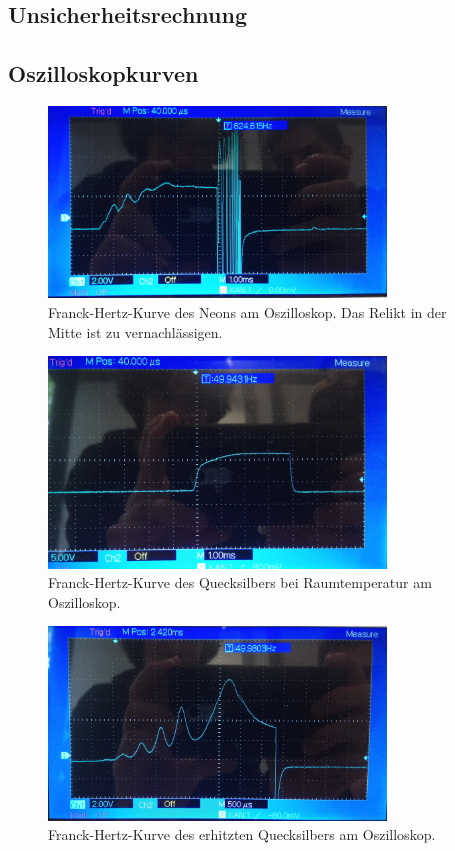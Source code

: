 \subsection{Unsicherheitsrechnung}\label{VGuD}


\subsection{Oszilloskopkurven}

\begin{figure}[ht]
	\centering
	\includegraphics[width=0.8\textwidth]{bilder/ne.jpg}
	\caption{Franck-Hertz-Kurve des Neons am Oszilloskop. Das Relikt in der Mitte ist zu vernachlässigen.}
	\label{fig:kurveNe}	
\end{figure}

\begin{figure}[ht]
	\centering
	\includegraphics[width=0.8\textwidth]{bilder/hgl.jpg}
	\caption{Franck-Hertz-Kurve des Quecksilbers bei Raumtemperatur am Oszilloskop.}
	\label{fig:kurveHgl}	
\end{figure}

\begin{figure}[ht]
	\centering
	\includegraphics[width=0.8\textwidth]{bilder/hgg.jpg}
	\caption{Franck-Hertz-Kurve des erhitzten Quecksilbers am Oszilloskop.}
	\label{fig:kurveHgg}	
\end{figure}